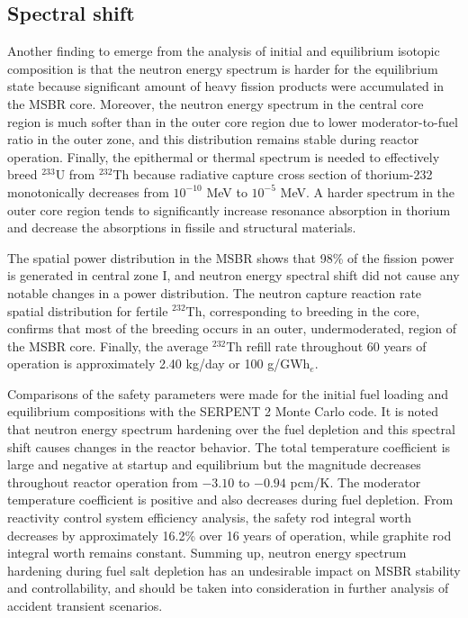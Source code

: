 \subsection{Spectral shift}
Another finding to emerge from the analysis of initial and equilibrium isotopic 
composition is that the neutron energy spectrum is harder for the equilibrium 
state because significant amount of heavy fission products were accumulated in 
the \gls{MSBR} core. Moreover, the neutron energy spectrum in the central core 
region is much softer than in the outer core region due to lower 
moderator-to-fuel ratio in the outer zone, and this distribution remains stable 
during reactor operation. Finally, the epithermal or thermal spectrum is needed 
to effectively breed $^{233}$U from $^{232}$Th because radiative capture cross 
section of thorium-232 monotonically decreases from $10^{-10}$ MeV to $10^{-5}$ 
MeV. A harder spectrum in the outer core region tends to significantly increase 
resonance absorption in thorium and decrease the absorptions in fissile and 
structural materials. 

The spatial power distribution in the \gls{MSBR} shows that 98\% of the fission 
power is generated in central zone I, and neutron energy spectral shift did not 
cause any notable changes in a power distribution. The neutron capture reaction 
rate spatial distribution for fertile $^{232}$Th, corresponding to breeding in 
the core, confirms that most of the breeding occurs in an outer, 
undermoderated, region of the \gls{MSBR} core. Finally, the average $^{232}$Th 
refill rate throughout 60 years of operation is approximately 2.40 kg/day or 
100 g/GWh$_e$.

Comparisons of the safety parameters were made for the initial fuel loading and 
equilibrium compositions with the SERPENT 2 Monte Carlo code. It is noted that 
neutron energy spectrum hardening over the fuel depletion and this spectral 
shift causes changes in the reactor behavior. The total temperature coefficient 
is large and negative at startup and equilibrium but the magnitude decreases 
throughout reactor operation from $-3.10$ to $-0.94$ pcm/K. The moderator 
temperature coefficient is positive and also decreases during fuel depletion. 
From reactivity control system efficiency analysis, the safety rod integral 
worth decreases by approximately 16.2\% over 16 years of operation, while 
graphite rod integral worth remains constant. Summing up, neutron energy 
spectrum hardening during fuel salt depletion has an undesirable impact on 
\gls{MSBR} stability and controllability, and should be taken into 
consideration in further analysis of accident transient scenarios.

